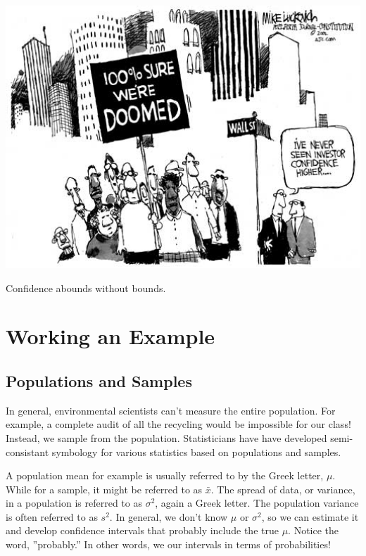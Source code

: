 \documentclass{tufte-handout}\usepackage[]{graphicx}\usepackage[]{color}
\begin{document}
\begin{marginfigure}
	\centering
		\includegraphics[width=1.00\textwidth]{Investor_confidence500.jpg}
	\caption{Confidence abounds without bounds.}
	\label{fig:Investor_confidence500}
\end{marginfigure}

\section{Working an Example}

\subsection{Populations and Samples}

In general, environmental scientists can't measure the entire population. For example, a complete audit of all the recycling would be impossible for our class!  Instead, we sample from the population. Statisticians have have developed semi-consistant symbology for various statistics based on populations and samples. 

A population mean for example is usually referred to by the Greek letter, $\mu$. While for a sample, it might be referred to as $\bar{x}$. The spread of data, or variance, in a population is referred to as $\sigma^2$, again a Greek letter. The population variance is often referred to as $s^2$. In general, we don't know $\mu$ or $\sigma^2$, so we can estimate it and develop confidence intervals that probably include the true $\mu$. Notice the word, ''probably.''  In other words, we our intervals in terms of probabilities!
\end{document}
